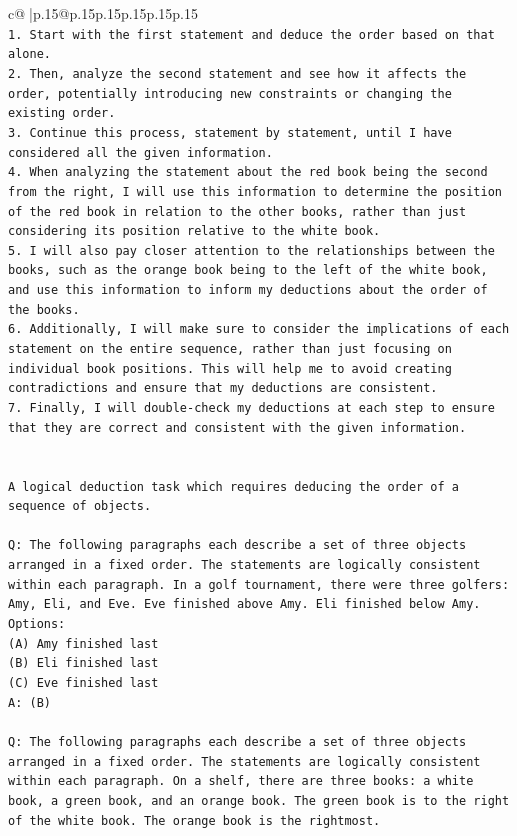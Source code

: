 \documentclass{article}
\begin{document}
{\begin{supertabular}{c@{$\;$}|p{.15\linewidth}@{}p{.15\linewidth}p{.15\linewidth}p{.15\linewidth}p{.15\linewidth}p{.15\linewidth}}
{{{\\ 
\texttt{1. Start with the first statement and deduce the order based on that alone.} \\
\texttt{2. Then, analyze the second statement and see how it affects the order, potentially introducing new constraints or changing the existing order.} \\
\texttt{3. Continue this process, statement by statement, until I have considered all the given information.} \\
\texttt{4. When analyzing the statement about the red book being the second from the right, I will use this information to determine the position of the red book in relation to the other books, rather than just considering its position relative to the white book.} \\
\texttt{5. I will also pay closer attention to the relationships between the books, such as the orange book being to the left of the white book, and use this information to inform my deductions about the order of the books.} \\
\texttt{6. Additionally, I will make sure to consider the implications of each statement on the entire sequence, rather than just focusing on individual book positions. This will help me to avoid creating contradictions and ensure that my deductions are consistent.} \\
\texttt{7. Finally, I will double{-}check my deductions at each step to ensure that they are correct and consistent with the given information.} \\
\\ 
\\ 
\texttt{A logical deduction task which requires deducing the order of a sequence of objects.} \\
\\ 
\texttt{Q: The following paragraphs each describe a set of three objects arranged in a fixed order. The statements are logically consistent within each paragraph. In a golf tournament, there were three golfers: Amy, Eli, and Eve. Eve finished above Amy. Eli finished below Amy.} \\
\texttt{Options:} \\
\texttt{(A) Amy finished last} \\
\texttt{(B) Eli finished last} \\
\texttt{(C) Eve finished last} \\
\texttt{A: (B)} \\
\\ 
\texttt{Q: The following paragraphs each describe a set of three objects arranged in a fixed order. The statements are logically consistent within each paragraph. On a shelf, there are three books: a white book, a green book, and an orange book. The green book is to the right of the white book. The orange book is the rightmost.} \\
}}}
\end{supertabular}}
\end{document}
